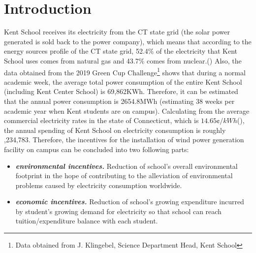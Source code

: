 \documentclass[review]{elsarticle}
\begin{document}
\section{Introduction}
\label{sec:Introduction}
Kent School receives its electricity from the CT state grid (the solar power generated is sold back to the power company), which means 
that according to the energy sources profile of the CT state grid, 52.4\% of the electricity that Kent School uses comes from natural 
gas and 43.7\% comes from nuclear.(\cite{u.s._energy_information_administration_2019}) Also, the data obtained from the 2019 Green Cup 
Challenge\footnote{Data obtained from J. Klingebel, Science Department Head, Kent School} shows that during a normal academic week, the 
average total power consumption of the entire Kent School (including Kent Center School) is 69,862KWh. Therefore, it can be estimated 
that the annual power consumption is 2654.8MWh (estimating 38 weeks per academic year when Kent students are on campus). Calculating 
from the average commercial electricity rates in the state of Connecticut, which is $14.65\cent/kWh$(\cite{u.s._energy_information_administration_2019}), 
the annual spending of Kent School on electricity consumption is roughly ,234,783. Therefore, the incentives for the 
installation of wind power generation facility on campus can be concluded into two following parts:
\begin{itemize}
    \item \textit{\textbf{environmental incentives.}} Reduction of school's overall environmental footprint in the hope of contributing 
    to the alleviation of environmental problems caused by electricity consumption worldwide.
    \item \textit{\textbf{economic incentives.}} Reduction of school's growing expenditure incurred by student's growing demand for 
    electricity so that school can reach tuition/expenditure balance with each student.
\end{itemize}
\end{document}
